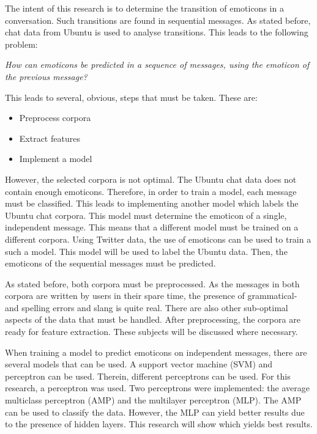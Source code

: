 
\begin{comment}
Problem: (roughly 1-2 pages)
• Explain the problem; what kind of assumptions / observations you have about the problem

\red{Find out what should be actually in this section} \\
\end{comment}

The intent of this research is to determine the transition of emoticons in a conversation. Such transitions are found in sequential messages. As stated before, chat data from Ubuntu is used to analyse transitions. This leads to the following problem: 
\begin{center}
\textit{How can emoticons be predicted in a sequence of messages, using the emoticon of the previous message?}
\end{center}

This leads to several, obvious, steps that must be taken. These are:
\begin{itemize}
\item Preprocess corpora
\item Extract features
\item Implement a model
\end{itemize}

However, the selected corpora is not optimal. The Ubuntu chat data does not contain enough emoticons. Therefore, in order to train a model, each message must be classified. This leads to implementing another model which labels the Ubuntu chat corpora. This model must determine the emoticon of a single, independent message. This means that a different model must be trained on a different corpora. Using Twitter data, the use of emoticons can be used to train a such a model. This model will be used to label the Ubuntu data. Then, the emoticons of the sequential messages must be predicted.

As stated before, both corpora must be preprocessed. As the messages in both corpora are written by users in their spare time, the presence of grammatical- and spelling errors and slang is quite real. There are also other sub-optimal aspects of the data that must be handled. After preprocessing, the corpora are ready for feature extraction. These subjects will be discussed where necessary.

When training a model to predict emoticons on independent messages, there are several models that can be used. A support vector machine (SVM) and perceptron can be used. Therein, different perceptrons can be used. For this research, a perceptron was used. Two perceptrons were implemented: the average multiclass perceptron (AMP) and the multilayer perceptron (MLP). The AMP can be used to classify the data. However, the MLP can yield better results due to the presence of hidden layers. This research will show which yields best results.

